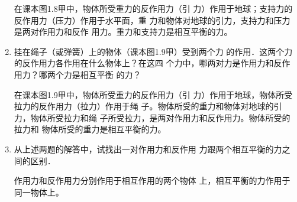 \begin{enumerate}
\begin{solution}
    在课本图1.8甲中，物体所受重力的反作用力（引
    力）作用于地球；支持力的反作用力（压力）作用于水平面，重
    力和物体对地球的引力，支持力和压力是两对作用力和反作
    用力。重力和支持力是相互平衡的力。
\end{solution}
\item  挂在绳子（或弹簧）上的物体（课本图1.9甲）受到两个力
的作用．这两个力的反作用力各作用在什么物体上？在这四
个力中，哪两对力是作用力和反作用力？哪两个力是相互平衡
的力？

\begin{solution}
    在课本图1.9甲中，物体所受重力的反作用力（引
    力）作用于地球，物体所受拉力的反作用力（拉力）作用于绳
    子。物体所受的重力和物体对地球的引力，物体所受拉力和绳
    子所受拉力，是两对作用力和反作用力。物体所受的拉力和
    物体所受的重力是相互平衡的力。
\end{solution}
\item 从上述两题的解答中，试找出一对作用力和反作用
力跟两个相互平衡的力之间的区别．

\begin{solution}
    作用力和反作用力分别作用于相互作用的两个物体
    上，相互平衡的力作用于同一物体上。
\end{solution}
\end{enumerate}


